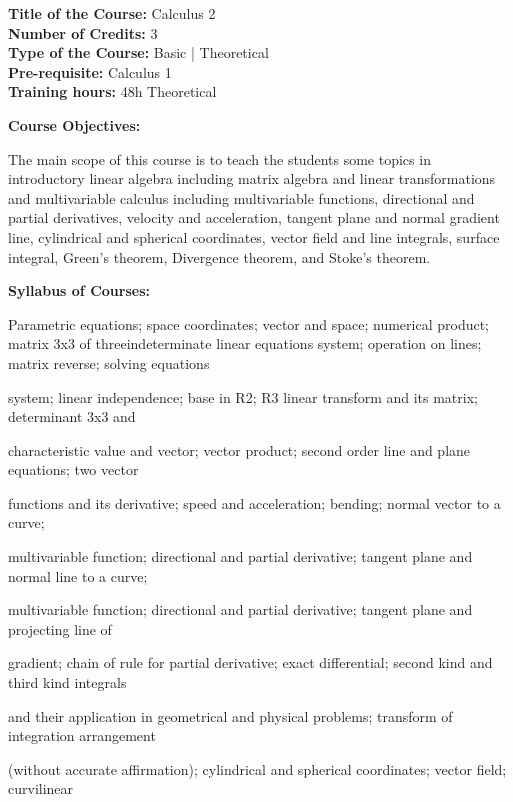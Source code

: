 \documentclass[12pt,a4paper]{article}
\begin{document}
\newpage
\textbf{Title of the Course:} Calculus 2\\
\textbf{Number of Credits:} 3\\
\textbf{Type of the Course:} Basic | Theoretical\\
\textbf{Pre-requisite:} Calculus 1\\
\textbf{Training hours:} 48h Theoretical\par\vspace{4pt}
\textbf{Course Objectives:}\par\vspace{2pt}
The main scope of this course is to teach the students some topics in introductory linear algebra
including matrix algebra and linear transformations and multivariable calculus including
multivariable functions, directional and partial derivatives, velocity and acceleration, tangent plane
and normal gradient line, cylindrical and spherical coordinates, vector field and line integrals,
surface integral, Green's theorem, Divergence theorem, and Stoke's theorem.\par\vspace{4pt}
\textbf{Syllabus of Courses:}\par\vspace{2pt}
Parametric equations; space coordinates; vector and space; numerical product; matrix 3x3 of threeindeterminate linear equations system; operation on lines; matrix reverse; solving equations\par
system; linear independence; base in R2; R3 linear transform and its matrix; determinant 3x3 and\par
characteristic value and vector; vector product; second order line and plane equations; two vector\par
functions and its derivative; speed and acceleration; bending; normal vector to a curve;\par
multivariable function; directional and partial derivative; tangent plane and normal line to a curve;\par
multivariable function; directional and partial derivative; tangent plane and projecting line of\par
gradient; chain of rule for partial derivative; exact differential; second kind and third kind integrals\par
and their application in geometrical and physical problems; transform of integration arrangement\par
(without accurate affirmation); cylindrical and spherical coordinates; vector field; curvilinear\par
\end{document}
